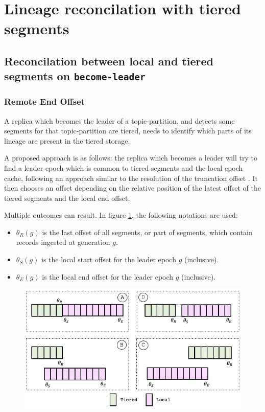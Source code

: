 \documentclass{article}
\begin{document}
\section{Lineage reconcilation with tiered segments}

\subsection{Reconcilation between local and tiered segments on \texttt{become-leader}}

\subsubsection{Remote End Offset}

A replica which becomes the leader of a topic-partition, and detects some segments for that topic-partition are tiered, needs to identify which parts of its lineage are present in the tiered storage. 

A proposed approach is as follows: the replica which becomes a leader will try to find a leader epoch which is common to tiered segments and the local epoch cache, following an approach similar to the resolution of the truncation offset \cite{KIP279}. It then chooses an offset depending on the relative position of the latest offset of the tiered segments and the local end offset.

Multiple outcomes can result. In figure \ref{fig:become-leader}, the following notations are used:

\begin{itemize}
	\item $\theta_R(g)$ is the last offset of all segments, or part of segments, which contain records ingested at generation $g$.
	\item $\theta_S(g)$ is the local start offset for the leader epoch $g$ (inclusive).
	\item $\theta_E(g)$ is the local end offset for the leader epoch $g$ (inclusive).
\end{itemize} 

\begin{figure}[h!]
	\centering
	\includegraphics[scale=0.65]{become-leader.png}
	\label{fig:become-leader}
\end{figure}
\end{document}
